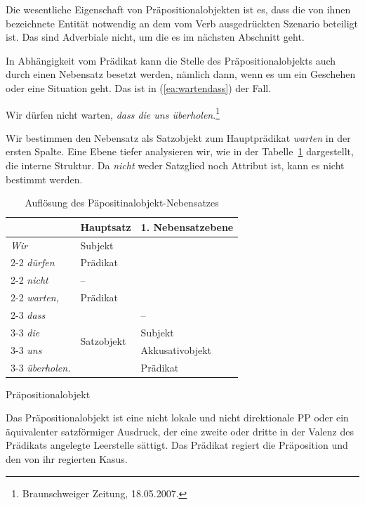 Die wesentliche Eigenschaft von Präpositionalobjekten ist es, dass die von ihnen bezeichnete Entität notwendig an dem vom Verb ausgedrückten Szenario beteiligt ist. Das sind Adverbiale nicht, um die es im nächsten Abschnitt geht.

In Abhängigkeit vom Prädikat kann die Stelle des Präpositionalobjekts auch durch einen Nebensatz besetzt werden, nämlich dann, wenn es um ein Geschehen oder eine Situation geht. Das ist in (\ref{ea:wartendass}) der Fall. 

\ea \label{ea:wartendass} Wir dürfen nicht warten, \textit{dass die uns überholen}.\footnote{Braunschweiger Zeitung, 18.05.2007.}
\z 

Wir bestimmen den Nebensatz als Satzobjekt zum Hauptprädikat \textit{warten} in der ersten Spalte. Eine Ebene tiefer analysieren wir, wie in der Tabelle~\ref{tab:PobjNS} dargestellt, die interne Struktur. Da \textit{nicht} weder Satzglied noch Attribut ist, kann es nicht bestimmt werden. 

\begin{table}
  \centering
  \begin{tabular}{l|l|l}
      & Hauptsatz & 1. Nebensatzebene \\
    \hline
    \textit{Wir} & Subjekt & \\ \cline{2-2}
    \textit{dürfen} & Prädikat \\ \cline{2-2}
    \textit{nicht} & --  \\ \cline{2-2} 
    \textit{warten,} & Prädikat &  \\ \cline{2-3}
    \textit{dass} & \multirow{4}{*}{Satzobjekt} & --  \\ \cline{3-3} 
    \textit{die} & & Subjekt  \\ \cline{3-3} 
    \textit{uns} & & Akkusativobjekt \\ \cline{3-3}
    \textit{überholen.} & & Prädikat \\ 
    \hline 
  \end{tabular}
  \caption{Auflösung des Päpositinalobjekt-Nebensatzes}
  \label{tab:PobjNS}
\end{table}


\begin{Definition}{Präpositionalobjekt}
    
\noindent Das Präpositionalobjekt ist eine nicht lokale und nicht direktionale PP oder ein äquivalenter satzförmiger Ausdruck, der eine zweite oder dritte in der Valenz des Prädikats angelegte Leerstelle sättigt. Das Prädikat regiert die Präposition und den von ihr regierten Kasus.   
\end{Definition}



